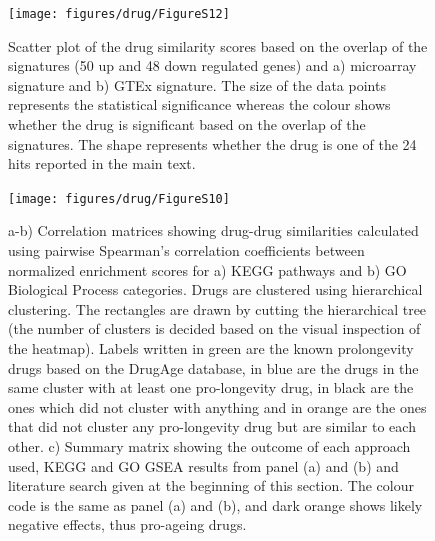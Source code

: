 \documentclass[12pt,twoside]{unicam}
\begin{document}
\begin{figure}

{\centering \texttt{[image: figures/drug/FigureS12]} 

}

\caption[Correlation between CMap results generated using the microarray and a combined ageing signature.]{Scatter plot of the drug similarity scores based on the overlap of the signatures (50 up and 48 down regulated genes) and a) microarray signature and b) GTEx signature. The size of the data points represents the statistical significance whereas the colour shows whether the drug is significant based on the overlap of the signatures. The shape represents whether the drug is one of the 24 hits reported in the main text.}\label{fig:drugFigS12}
\end{figure}

\begin{figure}

{\centering \texttt{[image: figures/drug/FigureS10]} 

}

\caption[Similarities between significant drug hits at the gene expression, GO BP, KEGG and literature evidence levels.]{a-b) Correlation matrices showing drug-drug similarities calculated using pairwise Spearman's correlation coefficients between normalized enrichment scores for a) KEGG pathways and b) GO Biological Process categories. Drugs are clustered using hierarchical clustering. The rectangles are drawn by cutting the hierarchical tree (the number of clusters is decided based on the visual inspection of the heatmap). Labels written in green are the known prolongevity drugs based on the DrugAge database, in blue are the drugs in the same cluster with at least one pro-longevity drug, in black are the ones which did not cluster with anything and in orange are the ones that did not cluster any pro-longevity drug but are similar to each other. c) Summary matrix showing the outcome of each approach used, KEGG and GO GSEA results from panel (a) and (b) and literature search given at the beginning of this section. The colour code is the same as panel (a) and (b), and dark orange shows likely negative effects, thus pro-ageing drugs.}\label{fig:drugFigS10}
\end{figure}
\end{document}
